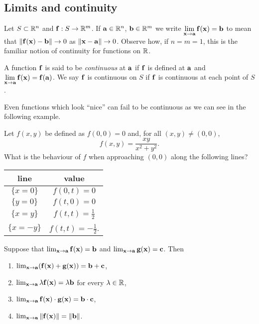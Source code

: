 \subsection*{Limits and continuity}

Let \(S\subset \bR^n\) and \(\ff : S \to \bR^m\).
If \(\aa\in \bR^n\), \(\bb\in \bR^m\) we write
    {\(  \displaystyle\lim_{\xx \to \aa}\ff(\xx) = \bb \)}
to mean that
\(\norm{\ff(\xx)-\bb} \to 0\) as \(\norm{\xx-\aa}\to 0\).
Observe how, if \(n=m=1\), this is the familiar notion of continuity for functions on \(\bR\).

\begin{definition}[continuous]
    A function \(\ff\) is said to be \emph{continuous} at \(\aa\) if \(\ff\) is defined at \(\aa\) and
    \(  \displaystyle\lim_{\xx \to \aa}\ff(\xx) = \ff(\aa)\).
    We say \(\ff\) is continuous on \(S\) if \(\ff\) is continuous at each point of \(S\).
\end{definition}

Even functions which look ``nice'' can fail to be continuous as we can see in the following example.

\begin{example*}
    Let \(f(x,y)\) be defined as \(f(0,0)=0\) and, for all \((x,y)\neq (0,0)\),
    \[
        f(x,y) =
        \frac{x y}{x^2 + y^2}.
    \]
    What is the behaviour of \(f\) when approaching \((0,0)\) along the following lines?
    \begin{center}
        \begin{tabular}{ c | c }
            line         & value                     \\
            \hline
            \(\{x=0\}\)  & \(f(0,t) =  0\)           \\
            \(\{y=0\}\)  & \(f(t,0) = 0\)            \\
            \(\{x=y\}\)  & \(f(t,t) = \frac{1}{2}\)  \\
            \(\{x=-y\}\) & \(f(t,t) =-\frac{1}{2}\).
        \end{tabular}
    \end{center}
\end{example*}

\begin{theorem}
    Suppose that \(  \lim_{\xx \to \aa}\ff(\xx) = \bb\) and \(  \lim_{\xx \to \aa}\gg(\xx) = \cc\).
    Then
    \begin{enumerate}
        \item \(  \lim_{\xx \to \aa}(\ff(\xx)+\gg(\xx)) = \bb+\cc\),
        \item \(  \lim_{\xx \to \aa} \lambda \ff(\xx) = \lambda \bb\) for every \(\lambda \in \bR\),
        \item \(  \lim_{\xx \to \aa}\ff(\xx)\cdot \gg(\xx) = \bb\cdot \cc\),
        \item \(  \lim_{\xx \to \aa} \norm{\ff(\xx)} = \norm{\bb}\).
    \end{enumerate}
\end{theorem}

